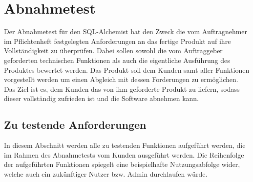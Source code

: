 
\chapter{Abnahmetest}

Der Abnahmetest für den SQL-Alchemist hat den Zweck die vom Auftragnehmer im Pflichtenheft festgelegten Anforderungen an das fertige Produkt auf ihre Vollständigkeit zu überprüfen. Dabei sollen sowohl die vom Auftraggeber geforderten technischen Funktionen als auch die eigentliche Ausführung des Produktes bewertet werden. Das Produkt soll dem Kunden samt aller Funktionen vorgestellt werden um einen Abgleich mit dessen Forderungen zu ermöglichen. Das Ziel ist es, dem Kunden das von ihm geforderte Produkt zu liefern, sodass dieser vollständig zufrieden ist und die Software abnehmen kann.

\section{Zu testende Anforderungen}

In diesem Abschnitt werden alle zu testenden Funktionen aufgeführt werden, die im Rahmen des Abnahmetests vom Kunden ausgeführt werden. Die Reihenfolge der aufgeführten Funktionen spiegelt eine beispielhafte Nutzungsabfolge wider, welche auch ein zukünftiger Nutzer bzw. Admin durchlaufen würde.

